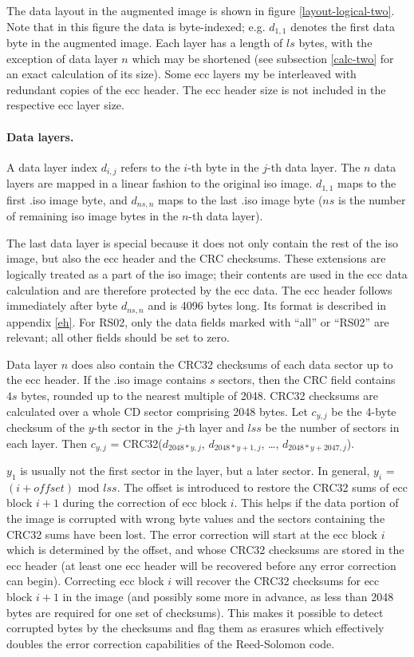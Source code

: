The data layout in the augmented image is shown in figure \ref{layout-logical-two}.
Note that in this figure the data is byte-indexed; e.g. $d_{1,1}$ denotes the
first data byte in the augmented image. Each layer has a length of
$ls$ bytes, with the exception of data layer $n$ which may be shortened (see subsection \ref{calc-two} for an exact calculation of its size). 
Some ecc layers my be interleaved with redundant copies of the ecc header. 
The ecc header size is not included in the respective ecc layer size.

\paragraph{Data layers.} A data layer index $d_{i,j}$ refers to the $i$-th byte in the $j$-th data layer.
The $n$ data layers are mapped in a linear fashion to the original iso image.
$d_{1,1}$ maps to the first .iso image byte, and $d_{ns,n}$ maps to the last .iso image
byte ($ns$ is the number of remaining iso image bytes in the $n$-th data layer). 

The last data layer is special because it does not only contain the rest of the iso image,
but also the ecc header and the CRC checksums. These extensions 
are logically treated as a part of the iso image; their contents are used in the
ecc data calculation and are therefore protected by the ecc data.
The ecc header follows immediately after byte $d_{ns,n}$ and is 4096 bytes long.
Its format is described in appendix \ref{eh}. For RS02, only the data fields
marked with ``all'' or ``RS02'' are relevant; all other fields should be set to zero.

Data layer $n$ does also contain the CRC32 checksums of each data sector
up to the ecc header. If the .iso image contains $s$ sectors, 
then the CRC field contains $4s$ bytes, rounded up
to the nearest multiple of 2048. 
CRC32 checksums are calculated over a whole CD sector comprising 2048 bytes.
Let $c_{y,j}$ be the 4-byte checksum of the $y$-th sector in the $j$-th layer
and $lss$ be the number of sectors in each layer.
Then $c_{y,j}$ = CRC32($d_{2048*y,j}$, $d_{2048*y+1,j}$, \dots, $d_{2048*y+2047,j}$).  
 
$y_1$ is usually not the first sector in the layer, but a later sector.
In general, $y_i$ = $(i+offset)$ mod $lss$. The offset is introduced to restore
the CRC32 sums of ecc block $i+1$ during the correction of ecc block $i$.
This helps if the data portion of the image is corrupted with wrong byte values and
the sectors containing the CRC32 sums have been lost. 
The error correction will start at the ecc block $i$ which is determined
by the offset, and whose CRC32 checksums are stored in the ecc header (at least one
ecc header will be recovered before any error correction can begin). Correcting
ecc block $i$ will recover the CRC32 checksums for ecc block $i+1$ in the image
(and possibly some more in advance, as less than 2048 bytes are required for
one set of checksums). This makes it possible to detect corrupted bytes by the
checksums and flag them as erasures which effectively doubles the error correction
capabilities of the Reed-Solomon code.

